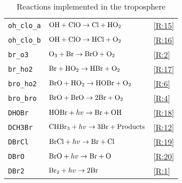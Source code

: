 \begin{table}[]
{\begin{tabular}{|l|l|l|}
\texttt{oh\_clo\_a}              & $\mathrm{OH} + \mathrm{ClO} \rightarrow \mathrm{Cl} + \mathrm{HO_2}$                              & \ref{R:15} \\
\texttt{oh\_clo\_b}              & $\mathrm{OH} + \mathrm{ClO} \rightarrow \mathrm{HCl} + \mathrm{O_2}$                              & \ref{R:16} \\
\texttt{br\_o3}                  & $\mathrm{O_3} + \mathrm{Br} \rightarrow \mathrm{BrO} + \mathrm{O_2}$                              & \ref{R:2} \\
\texttt{br\_ho2}                 & $\mathrm{Br} + \mathrm{HO_2} \rightarrow \mathrm{HBr} + \mathrm{O_2}$                             & \ref{R:17} \\
\texttt{bro\_ho2}                & $\mathrm{BrO} + \mathrm{HO_2} \rightarrow \mathrm{HOBr} + \mathrm{O_2}$                                    & \ref{R:6} \\
\texttt{bro\_bro}                & $\mathrm{BrO} + \mathrm{BrO} \rightarrow 2\mathrm{Br} + \mathrm{O_2}$                             & \ref{R:4} \\
\texttt{DHOBr}                   & $\mathrm{HOBr} + hv \rightarrow \mathrm{Br} + \mathrm{OH}$                                      & \ref{R:18} \\
\texttt{DCH3Br}                  & $\mathrm{CHBr_3} + hv \rightarrow 3\mathrm{Br} + \mathrm{Products}$                             & \ref{R:12} \\
\texttt{DBrCl}                   & $\mathrm{BrCl} + hv \rightarrow \mathrm{Br} + \mathrm{Cl}$                                      & \ref{R:19} \\
\texttt{DBrO}                    & $\mathrm{BrO} + hv \rightarrow \mathrm{Br} + \mathrm{O}$                                        & \ref{R:20} \\
\texttt{DBr2}                    & $\mathrm{Br_2} + hv \rightarrow 2\mathrm{Br} $                                                & \ref{R:1} \\
\hline
\end{tabular}
}
\label{tab:3}
\caption{Reactions implemented in the troposphere}
\end{table}